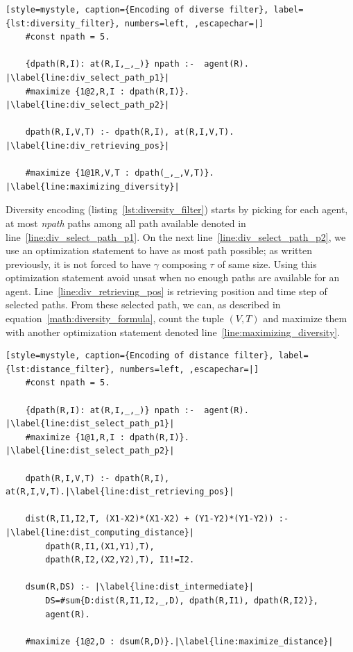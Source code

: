 \begin{minipage}[H]{\linewidth}
\begin{lstlisting}[style=mystyle, caption={Encoding of diverse filter}, label={lst:diversity_filter}, numbers=left, ,escapechar=|]
    #const npath = 5.

    {dpath(R,I): at(R,I,_,_)} npath :-  agent(R). |\label{line:div_select_path_p1}|
    #maximize {1@2,R,I : dpath(R,I)}. |\label{line:div_select_path_p2}|
    
    dpath(R,I,V,T) :- dpath(R,I), at(R,I,V,T). |\label{line:div_retrieving_pos}|
        
    #maximize {1@1R,V,T : dpath(_,_,V,T)}. |\label{line:maximizing_diversity}|
\end{lstlisting}
\end{minipage}

Diversity encoding (listing~\ref{lst:diversity_filter}) starts by picking for each agent, at most \textit{npath} paths among all path available denoted in line~\ref{line:div_select_path_p1}. On the next line~\ref{line:div_select_path_p2}, we use an optimization statement to have as most path possible; as written previously, it is not forced to have \(\gamma\) composing \(\tau\) of same size. Using this optimization statement  avoid unsat when no enough paths are available for an agent. Line~\ref{line:div_retrieving_pos} is retrieving position and time step of selected paths. From these selected path, we can, as described in equation~\ref{math:diversity_formula}, count the tuple \((V,T)\) and maximize them with another optimization statement denoted line~\ref{line:maximizing_diversity}.

\begin{minipage}[H]{\linewidth}
\begin{lstlisting}[style=mystyle, caption={Encoding of distance filter}, label={lst:distance_filter}, numbers=left, ,escapechar=|]
    #const npath = 5.

    {dpath(R,I): at(R,I,_,_)} npath :-  agent(R). |\label{line:dist_select_path_p1}|
    #maximize {1@1,R,I : dpath(R,I)}. |\label{line:dist_select_path_p2}|
    
    dpath(R,I,V,T) :- dpath(R,I), at(R,I,V,T).|\label{line:dist_retrieving_pos}|
         
    dist(R,I1,I2,T, (X1-X2)*(X1-X2) + (Y1-Y2)*(Y1-Y2)) :- |\label{line:dist_computing_distance}|
        dpath(R,I1,(X1,Y1),T),  
        dpath(R,I2,(X2,Y2),T), I1!=I2. 

    dsum(R,DS) :- |\label{line:dist_intermediate}|
        DS=#sum{D:dist(R,I1,I2,_,D), dpath(R,I1), dpath(R,I2)}, 
        agent(R).

    #maximize {1@2,D : dsum(R,D)}.|\label{line:maximize_distance}|
\end{lstlisting}

\end{minipage}

